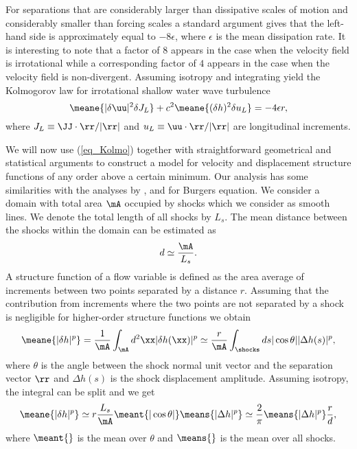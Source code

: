 For separations that are considerably larger than dissipative scales of motion and considerably smaller than forcing scales a standard argument \citep[see for example][]{Frisch} gives that the left-hand side is approximately equal to $ -8 \epsilon $, where $ \epsilon $ is the mean dissipation rate. It is interesting to note that a factor of $ 8 $ appears in the case when the velocity field is irrotational while a corresponding factor of $ 4 $ appears in the case when the velocity field is non-divergent.
Assuming isotropy and integrating yield the Kolmogorov law for
irrotational shallow water wave  turbulence
\begin{equation}
\meane{ |\delta \uu|^2 \delta J_L }
+ c^2\meane{ (\delta h)^2 \delta u_L } = -4 \epsilon r, \label{eq_Kolmo}
\end{equation}
where $J_L \equiv
\JJ\cdot\rr / |\rr|$ and $u_L \equiv \uu\cdot\rr / |\rr|$ are
longitudinal increments.




We will now use (\ref{eq_Kolmo}) together with straightforward geometrical and statistical arguments to construct a model for velocity and displacement structure functions of any order above a certain minimum.
Our analysis has some similarities with the analyses by \cite{BouchaudMezardParisi1995}, \cite{WeinanKhaninMazelSinai1997} and \cite{Weinan}
for Burgers equation.
We consider a domain with total area  $ {\mA} $ occupied by shocks which we
consider as smooth lines. We denote the total length of all shocks by $ L_s $.  The mean distance between the shocks within the domain can be estimated as
\begin{equation}
d \simeq \frac{\mA} {L_s} .
\end{equation}
A structure function of a flow variable is defined as the area average of increments  between two points separated by a distance $ r $.
Assuming that the contribution from increments where the two points are not separated by a shock is negligible for higher-order structure functions we obtain
\begin{eqnarray}
\meane{|\delta h|^p}
=  \frac{1}{\mA} \int_{\mA}  d^2\xx |\delta h(\xx)|^p
 \simeq  \frac{r}{\mA} \int_\shocks ds |\cos\theta| |\Delta h (s)|^p,
\end{eqnarray}
where $\theta$ is the angle between the shock normal unit vector and the separation
vector $\rr$ %
and $\Delta h (s)$ is the shock displacement amplitude.
%
Assuming isotropy, the integral can be split and we get
\begin{equation} \label{StepH}
\meane{|\delta h|^p}
\simeq
r \frac{L_s}{\mA} \meant{|\cos\theta|} \means{|\Delta h |^p}
\simeq  \frac{2}{\pi} \means{|\Delta h |^p} \frac{r}{d} ,
\end{equation}
where $\meant{}$ is the mean over $\theta$
and $\means{}$ is the mean over all shocks.


